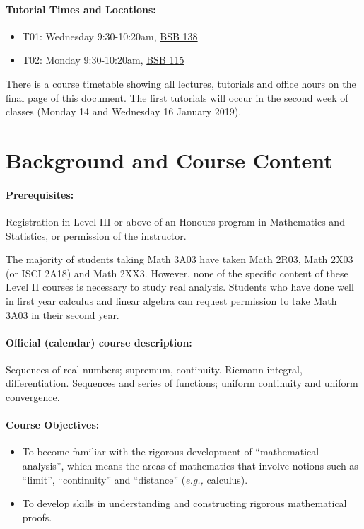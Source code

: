 \documentclass[12pt]{article}
\newcommand{\eg}{\emph{e.g.,\/}\xspace}
\begin{document}
\paragraph*{Tutorial Times and Locations:}
\begin{itemize}\addtolength{\itemsep}{-0.75\baselineskip}
\item T01: Wednesday 9:30-10:20am, \href{https://library.mcmaster.ca/spaces/cct}{BSB 138}
\item T02: Monday 9:30-10:20am, \href{https://library.mcmaster.ca/spaces/cct}{BSB 115}
\end{itemize}

\noindent
There is a course timetable showing all lectures, tutorials and office
hours on the \hyperlink{timetable}{final page of this document}.
The first tutorials will occur in the second week of classes
(Monday 14 and Wednesday 16 January 2019).

\section*{Background and Course Content}

\paragraph*{Prerequisites:} Registration in Level III or above of an Honours program in Mathematics and Statistics, or permission of the instructor.

The majority of students taking Math 3A03 have taken Math 2R03, Math 2X03 (or ISCI 2A18) and Math 2XX3.  However, none of the specific content of these Level II courses is necessary to study real analysis.  Students who have done well in first year calculus and linear algebra can request permission to take Math 3A03 in their second year.

\paragraph*{Official (calendar) course description:}
Sequences of real numbers; supremum, continuity. Riemann integral, differentiation. Sequences and series of functions; uniform continuity and uniform convergence.

\paragraph*{Course Objectives:}

\begin{itemize}
\item To become familiar with the rigorous development of ``mathematical analysis'', which means the areas of mathematics that involve notions such as ``limit'', ``continuity'' and ``distance'' (\eg calculus).
\item To develop skills in understanding and constructing rigorous mathematical proofs.
\end{itemize}
\end{document}
